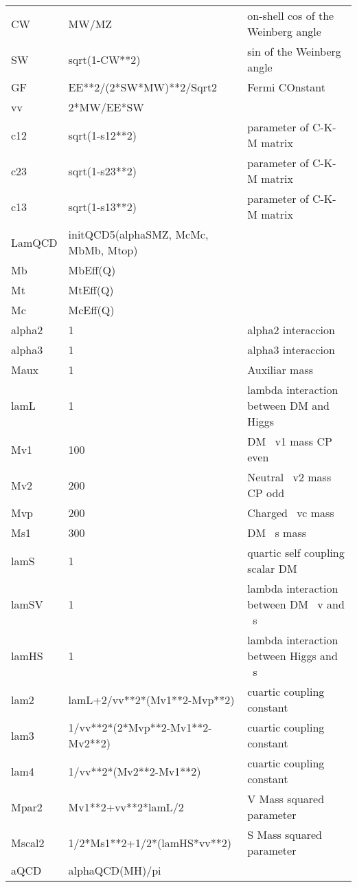 \begin{tabular}{|l|l|l|}
CW    &MW/MZ               &on-shell cos of the Weinberg angle \\
SW    &sqrt(1-CW**2)       &sin of the Weinberg angle \\
GF    &EE**2/(2*SW*MW)**2/Sqrt2&Fermi COnstant \\
vv    &2*MW/EE*SW          & \\
c12   &sqrt(1-s12**2)      &parameter  of C-K-M matrix \\
c23   &sqrt(1-s23**2)      &parameter  of C-K-M matrix \\
c13   &sqrt(1-s13**2)      &parameter  of C-K-M matrix \\
LamQCD&initQCD5(alphaSMZ, McMc, MbMb, Mtop)& \\
Mb    &MbEff(Q)            & \\
Mt    &MtEff(Q)            & \\
Mc    &McEff(Q)            & \\
alpha2&1                   &alpha2 interaccion \\
alpha3&1                   &alpha3 interaccion \\
Maux  &1                   &Auxiliar mass \\
lamL  &1                   &lambda interaction between DM and Higgs \\
Mv1   &100                 &DM ~v1 mass CP even \\
Mv2   &200                 &Neutral ~v2 mass CP odd \\
Mvp   &200                 &Charged ~vc mass \\
Ms1   &300                 &DM ~s mass \\
lamS  &1                   &quartic self coupling scalar DM \\
lamSV &1                   &lambda interaction between DM ~v and ~s \\
lamHS &1                   &lambda interaction between Higgs and ~s \\
lam2  &lamL+2/vv**2*(Mv1**2-Mvp**2)&cuartic coupling constant \\
lam3  &1/vv**2*(2*Mvp**2-Mv1**2-Mv2**2)&cuartic coupling constant \\
lam4  &1/vv**2*(Mv2**2-Mv1**2)&cuartic coupling constant \\
Mpar2 &Mv1**2+vv**2*lamL/2 &V Mass squared parameter \\
Mscal2&1/2*Ms1**2+1/2*(lamHS*vv**2)&S Mass squared parameter \\
aQCD  &alphaQCD(MH)/pi     & \\

\end{tabular}
